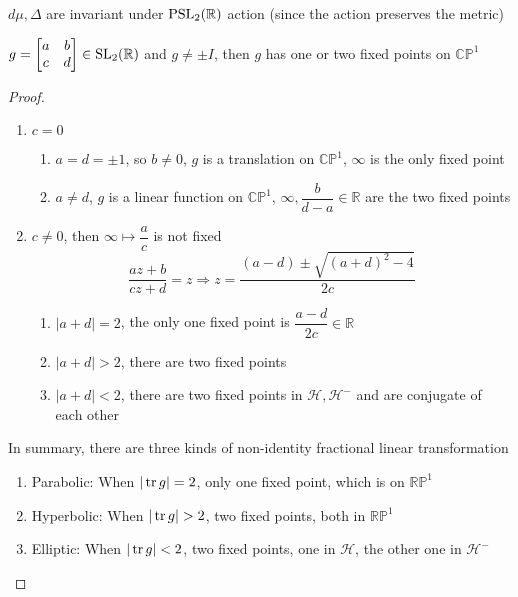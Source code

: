 \documentclass[main.tex]{subfiles}
\begin{document}
\begin{exercise}
 $d\mu,\Delta$ are invariant under $\operatorname{PSL}_2(\mathbb R)$ action (since the action preserves the metric)
\end{exercise}

\begin{theorem}
$g=\begin{bmatrix}
a&b\\
c&d
\end{bmatrix}\in\operatorname{SL}_2(\mathbb R)$ and $g\neq\pm I$, then $g$ has one or two fixed points on $\mathbb {CP}^1$
\end{theorem}

\begin{proof}
\begin{enumerate}[leftmargin=*, label=Case \arabic*:]
\item $c=0$
\begin{enumerate}[leftmargin=*, label=case \roman*:]
\item $a=d=\pm1$, so $b\neq0$, $g$ is a translation on $\mathbb{CP}^1$, $\infty$ is the only fixed point
\item $a\neq d$, $g$ is a linear function on $\mathbb{CP}^1$, $\infty,\dfrac{b}{d-a}\in\mathbb R$ are the two fixed points
\end{enumerate}
\item $c\neq0$, then $\infty\mapsto\dfrac{a}{c}$ is not fixed
\[\frac{az+b}{cz+d}=z\Rightarrow z=\frac{(a-d)\pm\sqrt{(a+d)^2-4}}{2c}\]
\begin{enumerate}[leftmargin=*, label=case \roman*:]
\item $|a+d|=2$, the only one fixed point is $\dfrac{a-d}{2c}\in\mathbb R$
\item $|a+d|>2$, there are two fixed points
\item $|a+d|<2$, there are two fixed points in $\mathcal H,\mathcal H^-$ and are conjugate of each other
\end{enumerate}
\end{enumerate}
In summary, there are three kinds of non-identity fractional linear transformation
\begin{enumerate}
\item Parabolic: When $|\operatorname{tr} g|=2$, only one fixed point, which is on $\mathbb {RP}^1$
\item Hyperbolic: When $|\tr g|>2$, two fixed points, both in $\mathbb{RP}^1$
\item Elliptic: When $|\operatorname{tr} g|<2$, two fixed points, one in $\mathcal H$, the other one in $\mathcal H^-$
\end{enumerate}
\end{proof}
\end{document}
